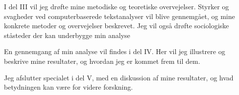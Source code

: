 I del III vil jeg drøfte mine metodiske og teoretiske overvejelser.
Styrker og svagheder ved computerbaserede tekstanalyser vil blive gennemgået, og mine konkrete metoder og overvejelser beskrevet.
Jeg vil også drøfte sociologiske ståsteder der kan underbygge min analyse 

En gennemgang af min analyse vil findes i del IV.
Her vil jeg illustrere og beskrive mine resultater, og hvordan jeg er kommet frem til dem.

Jeg afslutter specialet i del V, med en diskussion af mine resultater, og hvad betydningen kan være for videre forskning.
